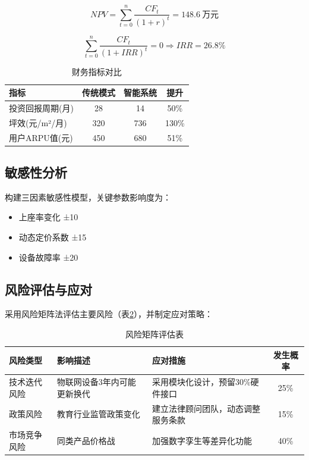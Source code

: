 \documentclass[12pt,a4paper]{IEEEtran} %
\begin{document}
\begin{equation}
  NPV = \sum_{t=0}^n \frac{CF_t}{(1+r)^t} = 148.6\ \text{万元}
\end{equation}

\begin{equation}
  \sum_{t=0}^n \frac{CF_t}{(1+IRR)^t} = 0 \Rightarrow IRR = 26.8\%
\end{equation}

\begin{table}[htbp]
  \centering
  \caption{财务指标对比}
  \label{tab:finance}
  \begin{tabular}{lccc}
    \toprule
    指标         & 传统模式 & 智能系统 & 提升    \\
    \midrule
    投资回报周期(月)  & 28   & 14   & 50\%  \\
    坪效(元/m²/月) & 320  & 736  & 130\% \\
    用户ARPU值(元) & 450  & 680  & 51\%  \\
    \bottomrule
  \end{tabular}
\end{table}

\subsection{敏感性分析}
构建三因素敏感性模型，关键参数影响度为：
\begin{itemize}
  \item 上座率变化 ±10%
  \item 动态定价系数 ±15%
  \item 设备故障率 ±20%
\end{itemize}


\subsection{风险评估与应对}
采用风险矩阵法评估主要风险（表\ref{tab:risk}），并制定应对策略：

\begin{table}[htbp]
  \centering
  \caption{风险矩阵评估表}
  \label{tab:risk}
  \begin{tabularx}{\linewidth}{lXXc}
    \toprule
    风险类型   & 影响描述           & 应对措施               & 发生概率 \\
    \midrule
    技术迭代风险 & 物联网设备3年内可能更新换代 & 采用模块化设计，预留30\%硬件接口 & 25\% \\
    政策风险   & 教育行业监管政策变化     & 建立法律顾问团队，动态调整服务条款  & 15\% \\
    市场竞争风险 & 同类产品价格战        & 加强数字孪生等差异化功能       & 40\% \\
    \bottomrule
  \end{tabularx}
\end{table}
\end{document}
